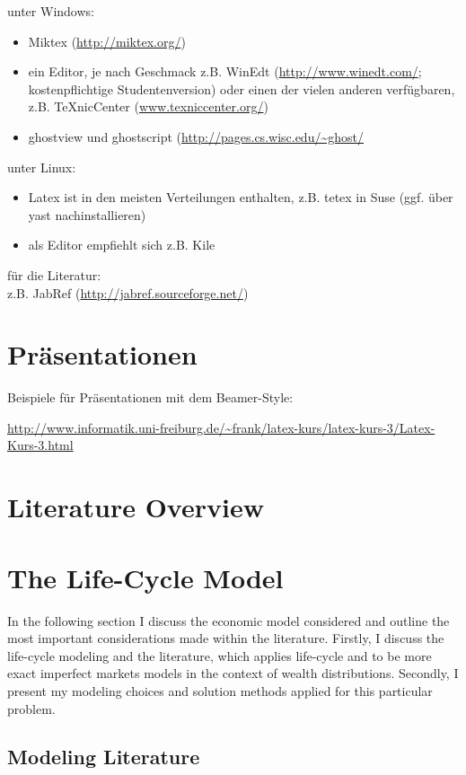 \documentclass[a4paper,12pt]{article}
\begin{document}
unter Windows:
\begin{itemize}
   \item Miktex (\url{http://miktex.org/})
   \item ein Editor, je nach Geschmack z.B. WinEdt (\url{http://www.winedt.com/}; kostenpflichtige Studentenversion) oder einen der vielen anderen verf\"ugbaren, z.B. TeXnicCenter (\url{www.texniccenter.org/})
   \item ghostview und ghostscript (\url{http://pages.cs.wisc.edu/~ghost/}
\end{itemize}
unter Linux:
\begin{itemize}
   \item Latex ist in den meisten Verteilungen enthalten, z.B. tetex in Suse (ggf. \"uber yast nachinstallieren)
   \item als Editor empfiehlt sich z.B. Kile
\end{itemize}
f\"ur die Literatur:\\
z.B. JabRef (\url{http://jabref.sourceforge.net/})


\section{Pr\"asentationen}

Beispiele f\"ur Pr\"asentationen mit dem Beamer-Style:

\url{http://www.informatik.uni-freiburg.de/~frank/latex-kurs/latex-kurs-3/Latex-Kurs-3.html}


\section{Literature Overview}
\label{Chapter2}

\section{The Life-Cycle Model}
\label{Chapter3}
In the following section I discuss the economic model considered and outline the most important considerations made within the literature. Firstly, I discuss the life-cycle modeling and the literature, which applies life-cycle and to be more exact imperfect markets models in the context of wealth distributions. Secondly, I present my modeling choices and solution methods applied for this particular problem. 
\subsection{Modeling Literature}
\end{document}
